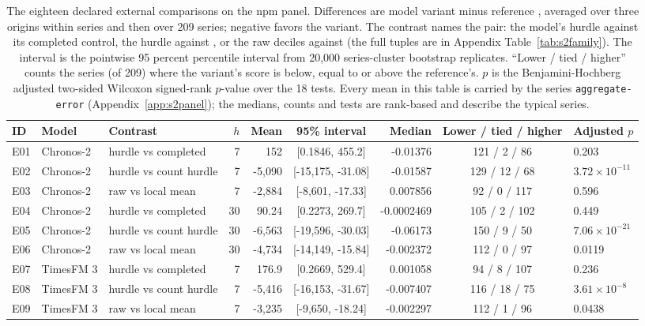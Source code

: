 \begin{table}[htbp]
\centering\footnotesize\setlength{\tabcolsep}{3pt}
\caption{The eighteen declared external comparisons on the npm panel. Differences are model variant minus
reference \qs{}, averaged over three origins within series and then over 209 series; negative favors the
variant. The contrast names the pair: the model's hurdle against its completed control, the hurdle against
\hc{}, or the raw deciles against \lm{} (the full tuples are in Appendix Table~\ref{tab:s2family}). The
interval is the pointwise 95 percent percentile interval from 20,000 series-cluster bootstrap replicates.
``Lower / tied / higher'' counts the series (of 209) where the variant's score is below, equal to or above
the reference's. $p$ is the Benjamini-Hochberg adjusted two-sided Wilcoxon signed-rank $p$-value over the
18 tests. Every mean in this table is carried by the series \texttt{aggregate-error}
(Appendix~\ref{app:s2panel}); the medians, counts and tests are rank-based and describe the typical series.}
\label{tab:s2ext}
\begin{tabular}{lllrrcrcl}
\toprule
ID & Model & Contrast & $h$ & Mean & 95\% interval & Median & Lower / tied / higher & Adjusted $p$ \\
\midrule
E01 & Chronos-2 & hurdle vs completed & 7 & 152 & [0.1846, 455.2] & -0.01376 & 121 / 2 / 86 & 0.203 \\
E02 & Chronos-2 & hurdle vs count hurdle & 7 & -5,090 & [-15,175, -31.08] & -0.01587 & 129 / 12 / 68 & $3.72 \times 10^{-11}$ \\
E03 & Chronos-2 & raw vs local mean & 7 & -2,884 & [-8,601, -17.33] & 0.007856 & 92 / 0 / 117 & 0.596 \\
E04 & Chronos-2 & hurdle vs completed & 30 & 90.24 & [0.2273, 269.7] & -0.0002469 & 105 / 2 / 102 & 0.449 \\
E05 & Chronos-2 & hurdle vs count hurdle & 30 & -6,563 & [-19,596, -30.03] & -0.06173 & 150 / 9 / 50 & $7.06 \times 10^{-21}$ \\
E06 & Chronos-2 & raw vs local mean & 30 & -4,734 & [-14,149, -15.84] & -0.002372 & 112 / 0 / 97 & 0.0119 \\
E07 & TimesFM 3 & hurdle vs completed & 7 & 176.9 & [0.2669, 529.4] & 0.001058 & 94 / 8 / 107 & 0.236 \\
E08 & TimesFM 3 & hurdle vs count hurdle & 7 & -5,416 & [-16,153, -31.67] & -0.007407 & 116 / 18 / 75 & $3.61 \times 10^{-8}$ \\
E09 & TimesFM 3 & raw vs local mean & 7 & -3,235 & [-9,650, -18.24] & -0.002297 & 112 / 1 / 96 & 0.0438 \\

\end{tabular}
\end{table}
